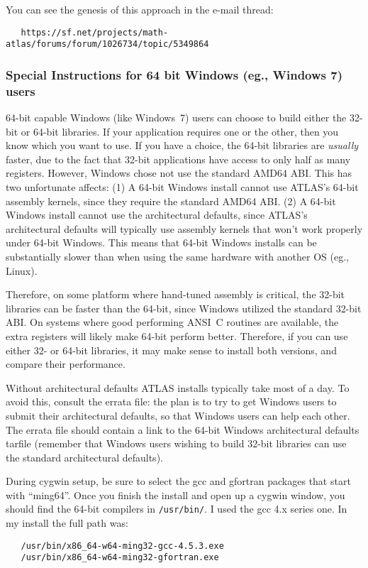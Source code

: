 \documentclass[11pt]{article}
\begin{document}
You can see the genesis of this approach in the e-mail thread:
\begin{verbatim}
   https://sf.net/projects/math-atlas/forums/forum/1026734/topic/5349864
\end{verbatim}

\subsubsection{Special Instructions for 64 bit Windows (eg., Windows 7) users}
\label{sec-windows64}

64-bit capable Windows (like Windows~7) users can choose to build either
the 32-bit or 64-bit libraries.  If your application requires one or the
other, then you know which you want to use.  If you have a choice,
the 64-bit libraries are {\em usually} faster, due to the fact that
32-bit applications have access to only half as many registers.  However,
Windows chose not use the standard AMD64 ABI.  This has two
unfortunate affects: (1) A 64-bit Windows install cannot use ATLAS's
64-bit assembly kernels, since they require the standard AMD64 ABI.
(2) A 64-bit Windows install cannot use the architectural defaults,
since ATLAS's architectural defaults will typically use assembly kernels
that won't work properly under 64-bit Windows.  This means that 64-bit
Windows installs can be substantially slower than when using the same
hardware with another OS (eg., Linux).

Therefore, on some platform where hand-tuned assembly is
critical, the 32-bit libraries can be faster than the 64-bit, since Windows
utilized the standard 32-bit ABI.  On systems where good performing 
ANSI~C routines are available, the extra registers will likely make 64-bit
perform better.  Therefore, if you can use either 32- or 64-bit libraries,
it may make sense to install both versions, and compare their performance.

Without architectural defaults ATLAS installs
typically take most of a day.  To avoid this, consult the errata file:
the plan is to try to get Windows users to submit their architectural
defaults, so that Windows users can help each other.  The errata file
should contain a link to the 64-bit Windows architectural defaults tarfile
(remember that Windows users wishing to build 32-bit libraries can
use the standard architectural defaults).

During cygwin setup, be sure
to select the gcc and gfortran packages that start with ``ming64''.
Once you finish the install and open up a cygwin window, you should
find the 64-bit compilers in \texttt{/usr/bin/}.  I used the gcc 4.x
series one.  In my install the full path was:
\begin{verbatim}
   /usr/bin/x86_64-w64-ming32-gcc-4.5.3.exe
   /usr/bin/x86_64-w64-ming32-gfortran.exe
\end{verbatim}
\end{document}
